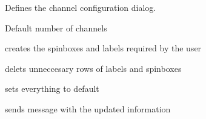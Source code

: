 \documentclass[letterpaper,10pt,english]{sphinxmanual}
\begin{document}
\begin{fulllineitems}
\label{\detokenize{code:mainGUI.propertiesWindow}}
Defines the channel configuration dialog.

\begin{fulllineitems}
\label{\detokenize{code:mainGUI.propertiesWindow.DEFAULT_CHANNELS}}
Default number of channels

\end{fulllineitems}


\begin{fulllineitems}
\label{\detokenize{code:mainGUI.propertiesWindow.creator}}
creates the spinboxes and labels required by the user

\end{fulllineitems}


\begin{fulllineitems}
\label{\detokenize{code:mainGUI.propertiesWindow.delete}}
delets unneccesary rows of labels and spinboxes

\end{fulllineitems}


\begin{fulllineitems}
\label{\detokenize{code:mainGUI.propertiesWindow.reset}}
sets everything to default

\end{fulllineitems}


\begin{fulllineitems}
\label{\detokenize{code:mainGUI.propertiesWindow.update}}
sends message with the updated information

\end{fulllineitems}


\end{fulllineitems}
\end{document}
